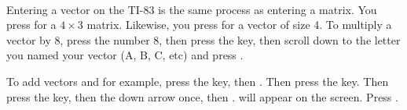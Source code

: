 \contributedby{\dougphelps}\\
Entering a vector on the TI-83 is the same process as entering a matrix.  You press  for a $4\times 3$ matrix.  Likewise, you press  for a vector of size 4.  To multiply a vector by 8, press the number 8,  then press the  key, then scroll down to the letter you named your vector (A, B, C, etc) and press .\par
%
To add vectors  and  for example, press the  key, then .  Then press the \computerfont{+} key.  Then press the  key, then the down arrow  once, then .  \computerfont{[A] + [B]} will appear on the screen. Press .
